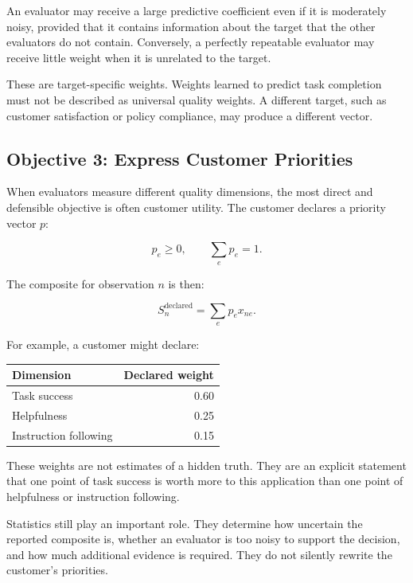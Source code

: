 \documentclass[11pt]{article}
\begin{document}
An evaluator may receive a large predictive coefficient even if it is
moderately noisy, provided that it contains information about the target that
the other evaluators do not contain. Conversely, a perfectly repeatable
evaluator may receive little weight when it is unrelated to the target.

These are target-specific weights. Weights learned to predict task completion
must not be described as universal quality weights. A different target, such
as customer satisfaction or policy compliance, may produce a different
vector.

\subsection{Objective 3: Express Customer Priorities}

When evaluators measure different quality dimensions, the most direct and
defensible objective is often customer utility. The customer declares a
priority vector \(p\):

\begin{equation}
p_e \geq 0,
\qquad
\sum_e p_e = 1.
\end{equation}

The composite for observation \(n\) is then:

\begin{equation}
S_n^{\mathrm{declared}}
=
\sum_e p_e x_{ne}.
\end{equation}

For example, a customer might declare:

\begin{center}
\begin{tabular}{lr}
\toprule
Dimension & Declared weight \\
\midrule
Task success & 0.60 \\
Helpfulness & 0.25 \\
Instruction following & 0.15 \\
\bottomrule
\end{tabular}
\end{center}

These weights are not estimates of a hidden truth. They are an explicit
statement that one point of task success is worth more to this application
than one point of helpfulness or instruction following.

Statistics still play an important role. They determine how uncertain the
reported composite is, whether an evaluator is too noisy to support the
decision, and how much additional evidence is required. They do not silently
rewrite the customer's priorities.
\end{document}
